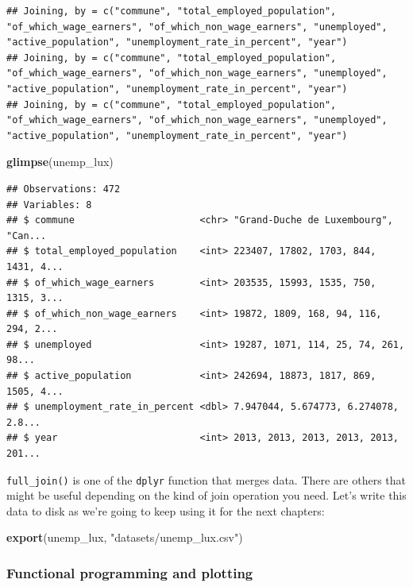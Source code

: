 \documentclass[]{gitbook}
\newenvironment{Shaded}{\begin{snugshade}}{\end{snugshade}}
\newcommand{\KeywordTok}[1]{\textcolor[rgb]{0.13,0.29,0.53}{\textbf{#1}}}
\newcommand{\NormalTok}[1]{#1}
\newcommand{\StringTok}[1]{\textcolor[rgb]{0.31,0.60,0.02}{#1}}
\begin{document}
\begin{verbatim}
## Joining, by = c("commune", "total_employed_population", "of_which_wage_earners", "of_which_non_wage_earners", "unemployed", "active_population", "unemployment_rate_in_percent", "year")
## Joining, by = c("commune", "total_employed_population", "of_which_wage_earners", "of_which_non_wage_earners", "unemployed", "active_population", "unemployment_rate_in_percent", "year")
## Joining, by = c("commune", "total_employed_population", "of_which_wage_earners", "of_which_non_wage_earners", "unemployed", "active_population", "unemployment_rate_in_percent", "year")
\end{verbatim}

\begin{Shaded}
\begin{Highlighting}[]
\KeywordTok{glimpse}\NormalTok{(unemp_lux)}
\end{Highlighting}
\end{Shaded}

\begin{verbatim}
## Observations: 472
## Variables: 8
## $ commune                      <chr> "Grand-Duche de Luxembourg", "Can...
## $ total_employed_population    <int> 223407, 17802, 1703, 844, 1431, 4...
## $ of_which_wage_earners        <int> 203535, 15993, 1535, 750, 1315, 3...
## $ of_which_non_wage_earners    <int> 19872, 1809, 168, 94, 116, 294, 2...
## $ unemployed                   <int> 19287, 1071, 114, 25, 74, 261, 98...
## $ active_population            <int> 242694, 18873, 1817, 869, 1505, 4...
## $ unemployment_rate_in_percent <dbl> 7.947044, 5.674773, 6.274078, 2.8...
## $ year                         <int> 2013, 2013, 2013, 2013, 2013, 201...
\end{verbatim}

\texttt{full\_join()} is one of the \texttt{dplyr} function that merges data. There are others that might be
useful depending on the kind of join operation you need. Let's write this data to disk as we're
going to keep using it for the next chapters:

\begin{Shaded}
\begin{Highlighting}[]
\KeywordTok{export}\NormalTok{(unemp_lux, }\StringTok{"datasets/unemp_lux.csv"}\NormalTok{)}
\end{Highlighting}
\end{Shaded}

\hypertarget{functional-programming-and-plotting}{%
\subsubsection{Functional programming and plotting}\label{functional-programming-and-plotting}}
\end{document}
